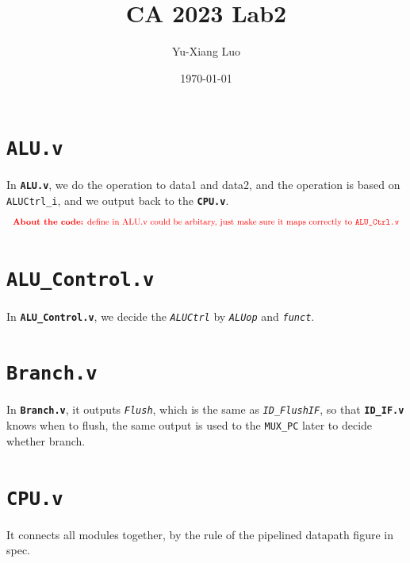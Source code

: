 \documentclass[12pt]{article}
\title{CA 2023 Lab2}
\author{Yu-Xiang Luo}
\date{\today}
\begin{document}
\maketitle

\section*{\texttt{ALU.v}}
In \textbf{\texttt{ALU.v}}, we do the operation to data1 and data2, and the operation is based on \texttt{ALUCtrl\_i}, and we output back to the \textbf{\texttt{CPU.v}}.\\
\[
	\text{\small \textcolor{red}{\textbf{About the code:} define in ALU.v could be arbitary, just make sure it maps correctly to \texttt{ALU\_Ctrl.v}}}
\]

\section*{\texttt{ALU\_Control.v}}
In \textbf{\texttt{ALU\_Control.v}}, we decide the \textit{\texttt{ALUCtrl}} by \textit{\texttt{ALUop}} and \texttt{\textit{funct}}.

\section* {\texttt{Branch.v}}
In \texttt{\textbf{Branch.v}}, it outputs \textit{\texttt{Flush}}, which is the same as \textit{\texttt{ID\_FlushIF}}, so that \texttt{\textbf{ID\_IF.v}} knows when to flush, the same output is used to the \texttt{MUX\_PC} later to decide whether branch.

\newpage
\section* {\texttt{CPU.v}}
It connects all modules together, by the rule of the pipelined datapath figure in spec.\\ \\
\end{document}
